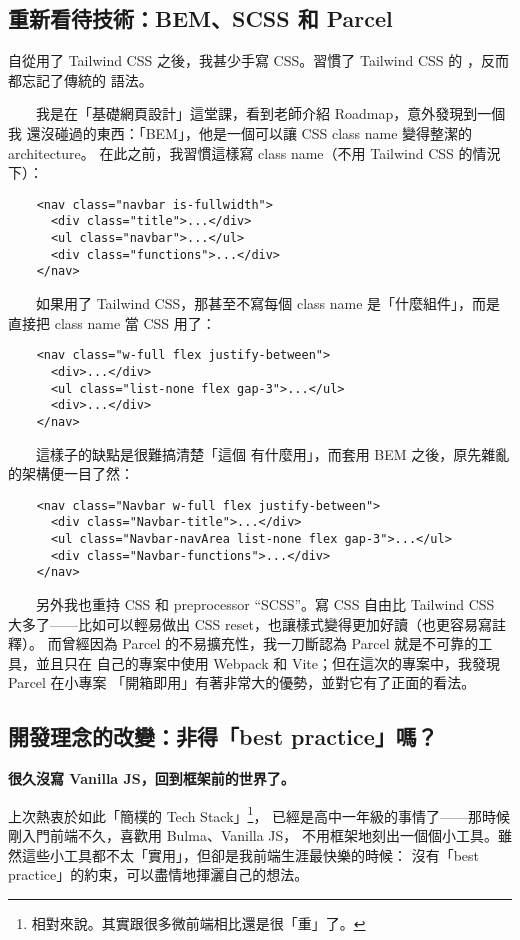 \documentclass[12pt]{article}
\begin{document}
  \subsection{重新看待技術：BEM、SCSS 和 Parcel}
  自從用了 Tailwind CSS 之後，我甚少手寫 CSS。習慣了 Tailwind CSS 的
  ，反而都忘記了傳統的  語法。

  　　我是在「基礎網頁設計」這堂課，看到老師介紹 Roadmap，意外發現到一個我
  還沒碰過的東西：「BEM」，他是一個可以讓 CSS class name 變得整潔的 architecture。
  在此之前，我習慣這樣寫 class name（不用 Tailwind CSS 的情況下）：

  \begin{verbatim}
    <nav class="navbar is-fullwidth">
      <div class="title">...</div>
      <ul class="navbar">...</ul>
      <div class="functions">...</div>
    </nav>
  \end{verbatim}

  　　如果用了 Tailwind CSS，那甚至不寫每個 class name 是「什麼組件」，而是
  直接把 class name 當 CSS 用了：

  \begin{verbatim}
    <nav class="w-full flex justify-between">
      <div>...</div>
      <ul class="list-none flex gap-3">...</ul>
      <div>...</div>
    </nav>
  \end{verbatim}

  　　這樣子的缺點是很難搞清楚「這個  有什麼用」，而套用 BEM
  之後，原先雜亂的架構便一目了然：

  \begin{verbatim}
    <nav class="Navbar w-full flex justify-between">
      <div class="Navbar-title">...</div>
      <ul class="Navbar-navArea list-none flex gap-3">...</ul>
      <div class="Navbar-functions">...</div>
    </nav>
  \end{verbatim}

  　　另外我也重持 CSS 和 preprocessor “SCSS”。寫 CSS 自由比 Tailwind CSS
  大多了——比如可以輕易做出 CSS reset，也讓樣式變得更加好讀（也更容易寫註釋）。
  而曾經因為 Parcel 的不易擴充性，我一刀斷認為 Parcel 就是不可靠的工具，並且只在
  自己的專案中使用 Webpack 和 Vite；但在這次的專案中，我發現 Parcel 在小專案
  「開箱即用」有著非常大的優勢，並對它有了正面的看法。

  \subsection{開發理念的改變：非得「best practice」嗎？}
  \begin{center}
    \textbf{很久沒寫 Vanilla JS，回到框架前的世界了。}
  \end{center}
  上次熱衷於如此「簡樸的 Tech Stack」\footnote{相對來說。其實跟很多微前端相比還是很「重」了。}，
  已經是高中一年級的事情了——那時候剛入門前端不久，喜歡用 Bulma、Vanilla JS，
  不用框架地刻出一個個小工具。雖然這些小工具都不太「實用」，但卻是我前端生涯最快樂的時候：
  沒有「best practice」的約束，可以盡情地揮灑自己的想法。
\end{document}
